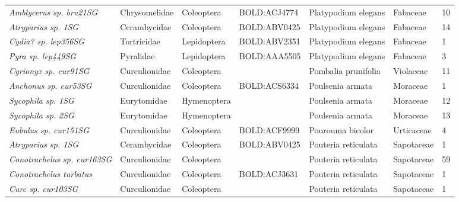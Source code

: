 \documentclass[11pt]{article}
\begin{document}
\begin{landscape}
\begin{longtable}{@{}lllllll@{}}
\textit{Amblycerus sp. bru21SG}                       & Chrysomelidae   & Coleoptera   & BOLD:ACJ4774 & Platypodium elegans                & Fabaceae         & 10    \\
\textit{Atryparius sp. 1SG}                           & Cerambycidae    & Coleoptera   & BOLD:ABV0425 & Platypodium elegans                & Fabaceae         & 14    \\
\textit{Cydia? sp. lep356SG}                          & Tortricidae     & Lepidoptera  & BOLD:ABV2351 & Platypodium elegans                & Fabaceae         & 1     \\
\textit{Pyra sp. lep449SG}                            & Pyralidae       & Lepidoptera  & BOLD:AAA5505 & Platypodium elegans                & Fabaceae         & 3     \\
\textit{Cyrionyx sp. cur91SG}                         & Curculionidae   & Coleoptera   &              & Pombalia prunifolia                & Violaceae        & 11    \\
\textit{Anchonus sp. cur53SG}                         & Curculionidae   & Coleoptera   & BOLD:ACS6334 & Poulsenia armata                   & Moraceae         & 1     \\
\textit{Sycophila sp. 1SG}                            & Eurytomidae     & Hymenoptera  &              & Poulsenia armata                   & Moraceae         & 12    \\
\textit{Sycophila sp. 2SG}                            & Eurytomidae     & Hymenoptera  &              & Poulsenia armata                   & Moraceae         & 13    \\
\textit{Eubulus sp. cur151SG}                         & Curculionidae   & Coleoptera   & BOLD:ACF9999 & Pourouma bicolor                   & Urticaceae       & 4     \\
\textit{Atryparius sp. 1SG}                           & Cerambycidae    & Coleoptera   & BOLD:ABV0425 & Pouteria reticulata                & Sapotaceae       & 1     \\
\textit{Conotrachelus sp. cur163SG}                   & Curculionidae   & Coleoptera   &              & Pouteria reticulata                & Sapotaceae       & 59    \\
\textit{Conotrachelus turbatus}                       & Curculionidae   & Coleoptera   & BOLD:ACJ3631 & Pouteria reticulata                & Sapotaceae       & 1     \\
\textit{Curc sp. cur103SG}                            & Curculionidae   & Coleoptera   &              & Pouteria reticulata                & Sapotaceae       & 1     \\

\end{longtable}
\end{landscape}
\end{document}
